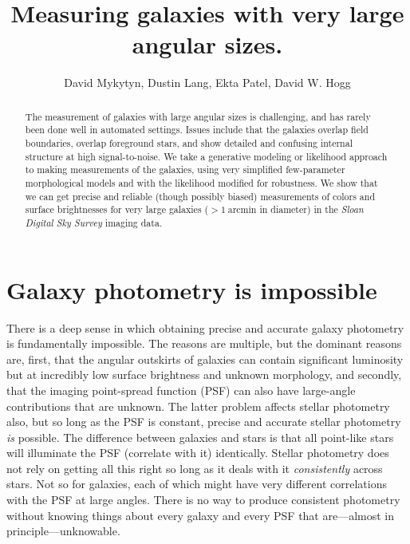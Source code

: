 \documentclass[12pt,preprint,pdftex]{aastex}
\newcounter{address}
\newcommand{\project}[1]{\textsl{#1}}
\newcommand{\units}[1]{\mathrm{#1}}
\renewcommand{\arcmin}{\units{arcmin}}
\begin{document}
\title{
       Measuring galaxies with very large angular sizes.
      }
\author{
        David Mykytyn\altaffilmark{\ref{CCPP}},
        Dustin Lang\altaffilmark{\ref{CMU}},
        Ekta Patel\altaffilmark{\ref{CCPP}},
        David W. Hogg\altaffilmark{\ref{CCPP},\ref{MPIA},\ref{email}}
       }
\setcounter{address}{1}

\begin{abstract}
The measurement of galaxies with large angular sizes is challenging,
and has rarely been done well in automated settings.  Issues include
that the galaxies overlap field boundaries, overlap foreground stars,
and show detailed and confusing internal structure at high
signal-to-noise.  We take a generative modeling or likelihood approach
to making measurements of the galaxies, using very simplified
few-parameter morphological models and with the likelihood modified
for robustness.  We show that we can get precise and reliable (though
possibly biased) measurements of colors and surface brightnesses for
very large galaxies ($>1~\arcmin$ in diameter) in the \project{Sloan
  Digital Sky Survey} imaging data.
\end{abstract}

\section{Galaxy photometry is impossible}

There is a deep sense in which obtaining precise and accurate galaxy
photometry is fundamentally impossible.  The reasons are multiple, but
the dominant reasons are, first, that the angular outskirts of
galaxies can contain significant luminosity but at incredibly low
surface brightness and unknown morphology, and secondly, that the
imaging point-spread function (PSF) can also have large-angle
contributions that are unknown.  The latter problem affects stellar
photometry also, but so long as the PSF is constant, precise and
accurate stellar photometry \emph{is} possible.  The difference
between galaxies and stars is that all point-like stars will
illuminate the PSF (correlate with it) identically.  Stellar
photometry does not rely on getting all this right so long as it deals
with it \emph{consistently} across stars.  Not so for galaxies, each
of which might have very different correlations with the PSF at large
angles.  There is no way to produce consistent photometry without
knowing things about every galaxy and every PSF that are---almost in
principle---unknowable.
\end{document}
